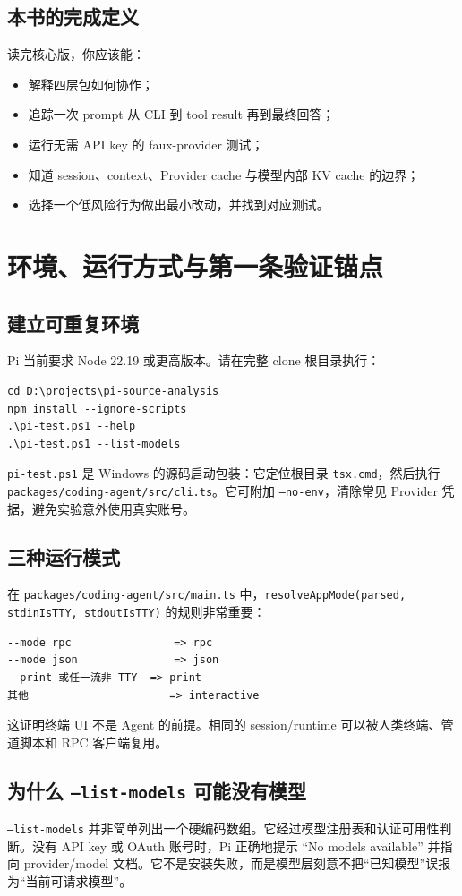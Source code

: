 \documentclass[UTF8,openany,11pt]{ctexbook}
\newcommand{\pathref}[1]{\texttt{#1}}
\begin{document}
\section{本书的完成定义}
读完核心版，你应该能：
\begin{itemize}
\item 解释四层包如何协作；
\item 追踪一次 prompt 从 CLI 到 tool result 再到最终回答；
\item 运行无需 API key 的 faux-provider 测试；
\item 知道 session、context、Provider cache 与模型内部 KV cache 的边界；
\item 选择一个低风险行为做出最小改动，并找到对应测试。
\end{itemize}

\chapter{环境、运行方式与第一条验证锚点}

\section{建立可重复环境}
Pi 当前要求 Node 22.19 或更高版本。请在完整 clone 根目录执行：
\begin{Verbatim}[fontsize=\small]
cd D:\projects\pi-source-analysis
npm install --ignore-scripts
.\pi-test.ps1 --help
.\pi-test.ps1 --list-models
\end{Verbatim}

\pathref{pi-test.ps1} 是 Windows 的源码启动包装：它定位根目录 \texttt{tsx.cmd}，然后执行 \pathref{packages/coding-agent/src/cli.ts}。它可附加 \texttt{--no-env}，清除常见 Provider 凭据，避免实验意外使用真实账号。

\section{三种运行模式}
在 \pathref{packages/coding-agent/src/main.ts} 中，\texttt{resolveAppMode(parsed, stdinIsTTY, stdoutIsTTY)} 的规则非常重要：
\begin{Verbatim}[fontsize=\small]
--mode rpc                => rpc
--mode json               => json
--print 或任一流非 TTY  => print
其他                      => interactive
\end{Verbatim}
这证明终端 UI 不是 Agent 的前提。相同的 session/runtime 可以被人类终端、管道脚本和 RPC 客户端复用。

\section{为什么 \texttt{--list-models} 可能没有模型}
\texttt{--list-models} 并非简单列出一个硬编码数组。它经过模型注册表和认证可用性判断。没有 API key 或 OAuth 账号时，Pi 正确地提示 ``No models available'' 并指向 provider/model 文档。它不是安装失败，而是模型层刻意不把“已知模型”误报为“当前可请求模型”。
\end{document}
